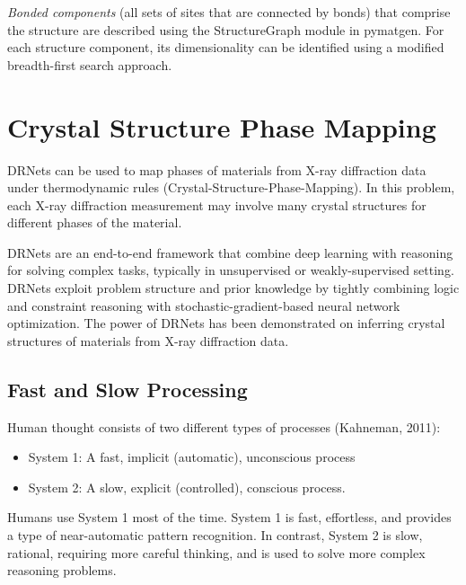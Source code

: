 \documentclass[book.tex]{subfiles}
\begin{document}
\textit{Bonded components} (all sets of sites that are connected by bonds) that comprise the structure are described using the StructureGraph module in pymatgen. For each structure component, its dimensionality can be identified using a modified breadth-first search approach.%




\section{Crystal Structure Phase Mapping}

DRNets\cite{chen2019deep} can be used to map phases of materials from X-ray diffraction data under thermodynamic rules (Crystal-Structure-Phase-Mapping). In this problem, each X-ray diffraction measurement may involve many crystal structures for different phases of the material.


DRNets are an end-to-end framework that combine deep learning with reasoning for solving complex tasks, typically in unsupervised or weakly-supervised setting. DRNets exploit problem structure and prior knowledge by tightly combining logic and constraint reasoning with stochastic-gradient-based neural network optimization. The power of
DRNets has been demonstrated on inferring crystal structures of materials from X-ray diffraction data.



\subsection{Fast and Slow Processing}

Human thought consists of two different types of processes (Kahneman, 2011): 
\begin{itemize}
\item System 1: A fast, implicit (automatic), unconscious process
\item System 2: A slow, explicit (controlled), conscious process. 
\end{itemize}
Humans use System 1 most of the time. System 1 is fast, effortless, and provides a type of
near-automatic pattern recognition. In contrast, System 2 is slow, rational, requiring more careful
thinking, and is used to solve more complex reasoning problems.
\end{document}

